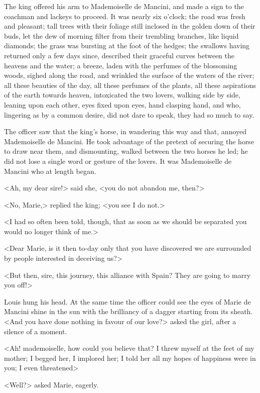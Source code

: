 The king offered his arm to Mademoiselle de Mancini, and made a sign to the coachman and lackeys to proceed. It was nearly six o'clock; the road was fresh and pleasant; tall trees with their foliage still inclosed in the golden down of their buds, let the dew of morning filter from their trembling branches, like liquid diamonds; the grass was bursting at the foot of the hedges; the swallows having returned only a few days since, described their graceful curves between the heavens and the water; a breeze, laden with the perfumes of the blossoming woods, sighed along the road, and wrinkled the surface of the waters of the river; all these beauties of the day, all these perfumes of the plants, all these aspirations of the earth towards heaven, intoxicated the two lovers, walking side by side, leaning upon each other, eyes fixed upon eyes, hand clasping hand, and who, lingering as by a common desire, did not dare to speak, they had so much to say.

The officer saw that the king's horse, in wandering this way and that, annoyed Mademoiselle de Mancini. He took advantage of the pretext of securing the horse to draw near them, and dismounting, walked between the two horses he led; he did not lose a single word or gesture of the lovers. It was Mademoiselle de Mancini who at length began.

<Ah, my dear sire!> said she, <you do not abandon me, then?>

<No, Marie,> replied the king; <you see I do not.>

<I had so often been told, though, that as soon as we should be separated you would no longer think of me.>

<Dear Marie, is it then to-day only that you have discovered we are surrounded by people interested in deceiving us?>

<But then, sire, this journey, this alliance with Spain? They are going to marry you off!>

Louis hung his head. At the same time the officer could see the eyes of Marie de Mancini shine in the sun with the brilliancy of a dagger starting from its sheath. <And you have done nothing in favour of our love?> asked the girl, after a silence of a moment.

<Ah! mademoiselle, how could you believe that? I threw myself at the feet of my mother; I begged her, I implored her; I told her all my hopes of happiness were in you; I even threatened\longdash>

<Well?> asked Marie, eagerly.

